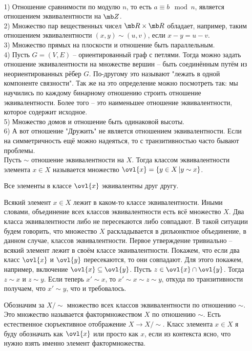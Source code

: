 \exm \\
1) Отношение сравнимости по модулю $n$, то есть $a\equiv b \mod n $, является отношением эквивалентности на $\mb Z$.\\
2) Множество пар вещественных чисел $\mb R \times \mb R$ обладает, например, таким отношением эквивалентности $(x,y)\sim (u,v)$, если $x-y=u-v$.\\
3) Множество прямых на плоскости и отношение быть параллельным.\\
4) Пусть $G=(V,E)$ -- ориентированный граф с петлями. Тогда можно задать отношение эквивалентности на множестве вершин -- быть соединённым путём из неориентированных рёбер $G$. По-другому это называют "лежать в одной компоненте связности". Так же на это определение можно посмотреть так: мы научились по каждому бинарному отношению строить отношение эквивалентности. Более того -- это наименьшее отношение эквивалентности, которое содержит исходное.\\
5) Множество домов и отношение быть одинаковой высоты.\\
6) А вот отношение "Дружить" не является отношением эквивалентности. Если на симметричность ещё можно надеяться, то с транзитивностью часто бывают проблемы. \\





\dfn Пусть $\sim $ отношение эквивалентности на $X$. Тогда классом эквивалентности элемента $x\in X$ называется множество $\ovl{x}=\{y \in X\,|y\sim x\}$. 
\edfn

\rm Все элементы в классе $\ovl{x}$ эквивалентны друг другу.
\erm 

\fct Всякий элемент $x\in X$ лежит в каком-то классе эквивалентности.  Иными словами, объединение всех классов эквивалентности есть всё множество $X$.  Два класса эквивалентности либо не пересекаются либо совпадают. В такой ситуации будем говорить, что множество $X$ раскладывается в дизъюнктное объединение, в данном случае, классов эквивалентности.
\efct
\proof Первое утверждение тривиально -- всякий элемент лежит в своём классе эквивалентности. Покажем, что если два класс $\ovl{x}$  и $\ovl{y}$ пересекаются, то они совпадают. Для этого покажем, например, включение $\ovl{x}\subseteq \ovl{y}$. Пусть $z\in \ovl{x}\cap \ovl{y}$. Тогда $z\sim x$ и $z\sim y$. Если теперь $x' \sim x$, то $x'\sim x\sim z\sim y$, откуда по транзитивности получаем, что $x'\sim y$, что  и требовалось.
\endproof

\dfn Обозначим за $X/\sim$ множество всех классов эквивалентности по отношению $\sim$. Это множество называется фактормножеством $X$ по отношению $\sim$. Есть естественное сюръективное отображение $X\to X/\sim$. Класс элемента $x\in X$ я буду обозначать как $\ovl{x}$ или просто как $x$, если из контекста ясно, что нужно взять именно элемент фактормножества.
\edfn

